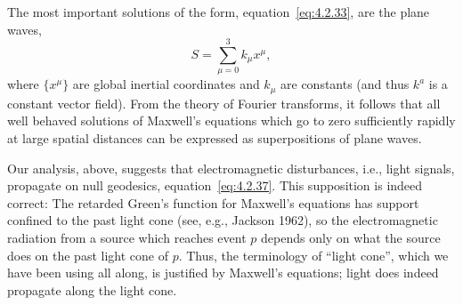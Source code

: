 The most important solutions of the form, equation~\eqref{eq:4.2.33}, are the
plane waves,
\begin{equation}
  S=\sum_{\mu=0}^{3}k_\mu x^\mu ,
  \tag{4.2.39}\label{eq:4.2.39}
\end{equation}
where \(\{x^\mu\}\) are global inertial coordinates and \(k_\mu\) are
constants (and thus \(k^a\) is a constant vector field). From the theory of
Fourier transforms, it follows that all well behaved solutions of Maxwell's
equations which go to zero sufficiently rapidly at large spatial distances can be
expressed as superpositions of plane waves.

Our analysis, above, suggests that electromagnetic disturbances, i.e., light
signals, propagate on null geodesics, equation~\eqref{eq:4.2.37}. This
supposition is indeed correct: The retarded Green's function for Maxwell's
equations has support confined to the past light cone (see, e.g., Jackson 1962), so
the electromagnetic radiation from a source which reaches event \(p\) depends
only on what the source does on the past light cone of \(p\). Thus, the
terminology of \textquotedblleft light cone\textquotedblright, which we have been
using all along, is justified by Maxwell's equations; light does indeed propagate
along the light cone.
